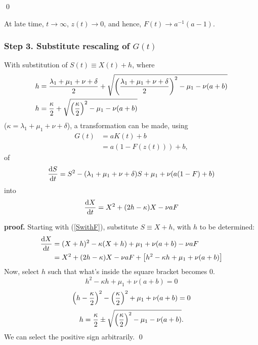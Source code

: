 \qed

\noindent
At late time, $t\to\infty$, $z(t)\to 0$, and hence, $F(t)\to a^{-1}(a-1)$.
    



\subsubsection{Step 3. Substitute rescaling of $G(t)$}



\begin{lemma}
With substitution of $S(t) \equiv X(t) + h$, where
\begin{align*}
h &= \frac{\lambda_1 + \mu_1 + \nu + \delta}{2} + \sqrt{\left(\frac{\lambda_1 + \mu_1 + \nu + \delta}{2}\right)^2 - \mu_1 - \nu(a+b)}\\
h &= \frac{\kappa}{2} + \sqrt{\left(\frac{\kappa}{2}\right)^2 - \mu_1 - \nu(a+b)}
\end{align*}
($\kappa = \lambda_1 + \mu_1 + \nu + \delta$), a transformation can be made, using 
\begin{align*}
G(t) &= aK(t) + b\\
 &= a(1-F(z(t))) + b,
\end{align*}
of 
\begin{equation}
\label{SwithF}
\displaystyle\frac{{\rm d} S}{{\rm d} t} = S ^2 - (\lambda_1 + \mu_1 + \nu + \delta)S + \mu_1 + \nu (a(1-F) + b)
\end{equation}
into 
$$\displaystyle\frac{{\rm d} X}{{\rm d} t} = X^2 + (2h-\kappa)X - \nu a F$$

\end{lemma}


\noindent
\textbf{proof.} Starting with (\ref{SwithF}), substitute $S\equiv X+h$, with $h$ to be determined:
\begin{align*}
\displaystyle\frac{{\rm d} X}{{\rm d} t} &= (X+h)^2 - \kappa(X+h) + \mu_1 + \nu(a+b) - \nu a F\\
&= X^2 + (2h-\kappa)X - \nu a F+ \left[ h^2  - \kappa h + \mu_1 + \nu (a+b)\right] 
\end{align*}
Now, select $h$ such that what's inside the square bracket becomes 0.
$$h^2  - \kappa h + \mu_1 + \nu (a+b)=0$$
$$\left( h-\frac{\kappa}{2}\right)^2 - \left(\frac{\kappa}{2}\right)^2 + \mu_1 + \nu(a+b) = 0$$
$$h = \frac{\kappa}{2} \pm \sqrt{\left(\frac{\kappa}{2}\right)^2  - \mu_1 - \nu(a+b)}.$$
We can select the positive sign arbitrarily. 
\qed




